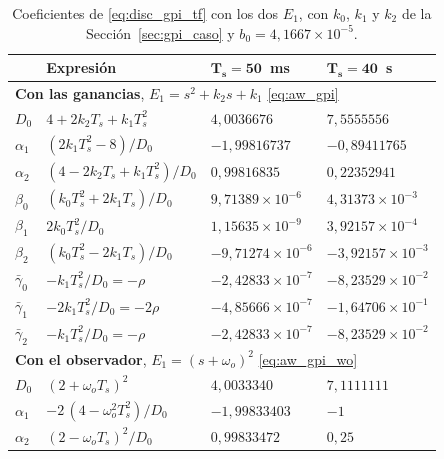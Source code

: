 \begin{table}[H]
\centering
\caption[Coeficientes del GPI y de la planta discretizados con Tustin]{Coeficientes
  de \eqref{eq:disc_gpi_tf} con los dos $E_1$, con $k_0$, $k_1$ y $k_2$ de la
  Sección~\ref{sec:gpi_caso} y $b_0 = 4{,}1667\times10^{-5}$.}
\label{tab:disc_gpi_coef}
\renewcommand{\arraystretch}{1.3}
\small
\begin{tabular}{llll}
\toprule
 & \textbf{Expresión} & $\boldsymbol{T_s = 50}$~\textbf{ms} & $\boldsymbol{T_s = 40}$~\textbf{s} \\
\midrule
\multicolumn{4}{l}{\textbf{Con las ganancias}, $E_1 = s^2 + k_2 s + k_1$ \eqref{eq:aw_gpi}} \\
$D_0$      & $4 + 2k_2 T_s + k_1 T_s^2$                    & $4{,}0036676$              & $7{,}5555556$ \\
$\alpha_1$ & $(2k_1 T_s^2 - 8)/D_0$                        & $-1{,}99816737$            & $-0{,}89411765$ \\
$\alpha_2$ & $(4 - 2k_2 T_s + k_1 T_s^2)/D_0$              & $0{,}99816835$             & $0{,}22352941$ \\
$\beta_0$  & $(k_0 T_s^2 + 2k_1 T_s)/D_0$                  & $9{,}71389\times10^{-6}$   & $4{,}31373\times10^{-3}$ \\
$\beta_1$  & $2k_0 T_s^2/D_0$                              & $1{,}15635\times10^{-9}$   & $3{,}92157\times10^{-4}$ \\
$\beta_2$  & $(k_0 T_s^2 - 2k_1 T_s)/D_0$                  & $-9{,}71274\times10^{-6}$  & $-3{,}92157\times10^{-3}$ \\
$\bar{\gamma}_0$ & $-k_1 T_s^2/D_0 = -\rho$                      & $-2{,}42833\times10^{-7}$  & $-8{,}23529\times10^{-2}$ \\
$\bar{\gamma}_1$ & $-2k_1 T_s^2/D_0 = -2\rho$                    & $-4{,}85666\times10^{-7}$  & $-1{,}64706\times10^{-1}$ \\
$\bar{\gamma}_2$ & $-k_1 T_s^2/D_0 = -\rho$                      & $-2{,}42833\times10^{-7}$  & $-8{,}23529\times10^{-2}$ \\
\midrule
\multicolumn{4}{l}{\textbf{Con el observador}, $E_1 = (s + \omega_o)^2$ \eqref{eq:aw_gpi_wo}} \\
$D_0$      & $(2 + \omega_o T_s)^2$                                         & $4{,}0033340$              & $7{,}1111111$ \\
$\alpha_1$ & $-2\,(4 - \omega_o^2 T_s^2)/D_0$                               & $-1{,}99833403$            & $-1$ \\
$\alpha_2$ & $(2 - \omega_o T_s)^2/D_0$                                     & $0{,}99833472$             & $0{,}25$ \\

\end{tabular}
\end{table}

